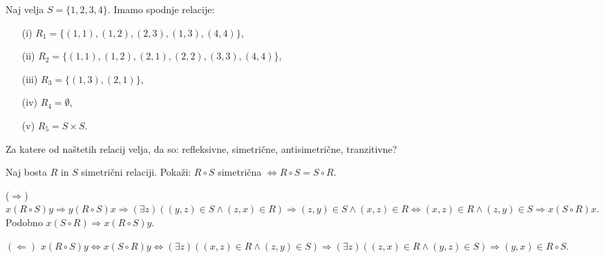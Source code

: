 \documentclass[11pt,paper=b5,footinclude,headinclude]{scrbook} %
\newtheorem{ex}{Vaja\hypertarget{sol:\theex}}[chapter]
\begin{document}
\begin{ex}
 Naj velja  $S=\{1,2,3,4\}$. Imamo spodnje relacije:
\begin{enumerate}
\item[(i)] $R_1= \{(1,1),(1,2),(2,3), (1,3), (4,4)\}$,
\item[(ii)] $R_2= \{(1,1),(1,2),(2,1), (2,2), (3,3), (4,4)\}$,
\item[(iii)] $R_3= \{(1,3),(2,1)\}$,
\item[(iv)] $R_4= \emptyset$,
\item[(v)] $R_5= S\times S$.
\end{enumerate}
Za katere od naštetih relacij velja, da so: refleksivne, simetrične, antisimetrične, tranzitivne? 

\end{ex}
\begin{ex}
 Naj bosta $R$ in $S$ simetrični relaciji. Pokaži: $R\circ S$ simetrična $\Leftrightarrow R\circ S = S \circ R$.
\begin{sol}
     ($\Rightarrow$) $x(R\circ S)y \Rightarrow y(R\circ S)x \Rightarrow (\exists z) ((y,z)\in S \wedge (z,x)\in R) \Rightarrow (z,y)\in S \wedge (x,z)\in R \Leftrightarrow (x,z)\in R \wedge (z,y)\in S \Rightarrow x(S\circ R)x$. Podobno $x(S\circ R) \Rightarrow x(R\circ S)y$.

$(\Leftarrow)$ $x(R\circ S)y \Leftrightarrow x(S\circ R)y \Leftrightarrow (\exists z)((x,z)\in R \wedge (z,y)\in S)\Rightarrow (\exists z)((z,x)\in R \wedge (y,z)\in S)\Rightarrow (y,x) \in R\circ S$.

\end{sol}
\end{ex}
\end{document}
